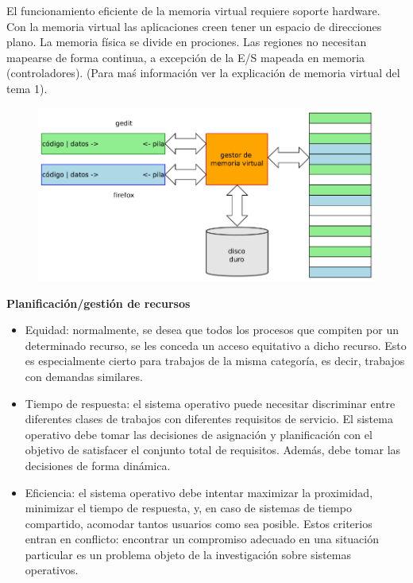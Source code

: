 \documentclass{article}
\begin{document}
El funcionamiento eficiente de la memoria virtual requiere soporte hardware.\\

Con la memoria virtual las aplicaciones creen tener un espacio de direcciones plano. La memoria física se divide en prociones. Las regiones no necesitan mapearse de forma continua, a excepción de la E/S mapeada en memoria (controladores). (Para maś información ver la explicación de memoria virtual del tema 1).

\begin{figure}[h]
\centering
\includegraphics[scale=1, width=\textwidth]{mem_virtual.png}
\end{figure}

\textbf{Planificación/gestión de recursos}

\begin{itemize}
\item Equidad: normalmente, se desea que todos los procesos que compiten por un determinado recurso, se les conceda un acceso equitativo a dicho recurso. Esto es especialmente cierto para trabajos de la misma categoría, es decir, trabajos con demandas similares.

\item Tiempo de respuesta: el sistema operativo puede necesitar discriminar entre diferentes clases de trabajos con diferentes requisitos de servicio. El sistema operativo debe tomar las decisiones de asignación y planificación con el objetivo de satisfacer el conjunto total de requisitos. Además, debe tomar las decisiones de forma dinámica. 

\item Eficiencia: el sistema operativo debe intentar maximizar la proximidad, minimizar el tiempo de respuesta, y, en caso de sistemas de tiempo compartido, acomodar tantos usuarios como sea posible. Estos criterios entran en conflicto: encontrar un compromiso adecuado en una situación particular es un problema objeto de la investigación sobre sistemas operativos.
\end{itemize}
\end{document}

